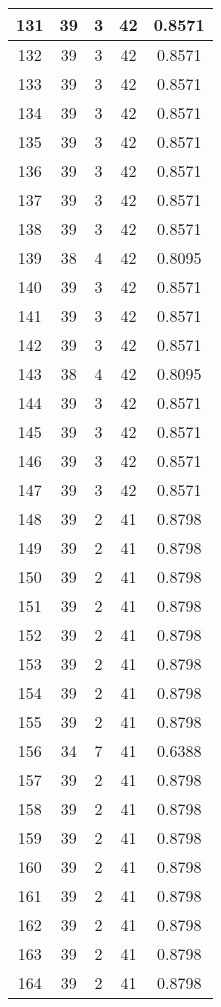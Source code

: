 \documentclass[letterpaper, 12pt]{article}
\begin{document}
\begin{longtable}{|c|c|c|c|c|}
\hline
131 & 39 & 3 & 42 & 0.8571 \\
\hline
132 & 39 & 3 & 42 & 0.8571 \\
\hline
133 & 39 & 3 & 42 & 0.8571 \\
\hline
134 & 39 & 3 & 42 & 0.8571 \\
\hline
135 & 39 & 3 & 42 & 0.8571 \\
\hline
136 & 39 & 3 & 42 & 0.8571 \\
\hline
137 & 39 & 3 & 42 & 0.8571 \\
\hline
138 & 39 & 3 & 42 & 0.8571 \\
\hline
139 & 38 & 4 & 42 & 0.8095 \\
\hline
140 & 39 & 3 & 42 & 0.8571 \\
\hline
141 & 39 & 3 & 42 & 0.8571 \\
\hline
142 & 39 & 3 & 42 & 0.8571 \\
\hline
143 & 38 & 4 & 42 & 0.8095 \\
\hline
144 & 39 & 3 & 42 & 0.8571 \\
\hline
145 & 39 & 3 & 42 & 0.8571 \\
\hline
146 & 39 & 3 & 42 & 0.8571 \\
\hline
147 & 39 & 3 & 42 & 0.8571 \\
\hline
148 & 39 & 2 & 41 & 0.8798 \\
\hline
149 & 39 & 2 & 41 & 0.8798 \\
\hline
150 & 39 & 2 & 41 & 0.8798 \\
\hline
151 & 39 & 2 & 41 & 0.8798 \\
\hline
152 & 39 & 2 & 41 & 0.8798 \\
\hline
153 & 39 & 2 & 41 & 0.8798 \\
\hline
154 & 39 & 2 & 41 & 0.8798 \\
\hline
155 & 39 & 2 & 41 & 0.8798 \\
\hline
156 & 34 & 7 & 41 & 0.6388 \\
\hline
157 & 39 & 2 & 41 & 0.8798 \\
\hline
158 & 39 & 2 & 41 & 0.8798 \\
\hline
159 & 39 & 2 & 41 & 0.8798 \\
\hline
160 & 39 & 2 & 41 & 0.8798 \\
\hline
161 & 39 & 2 & 41 & 0.8798 \\
\hline
162 & 39 & 2 & 41 & 0.8798 \\
\hline
163 & 39 & 2 & 41 & 0.8798 \\
\hline
164 & 39 & 2 & 41 & 0.8798 \\

\end{longtable}
\end{document}
